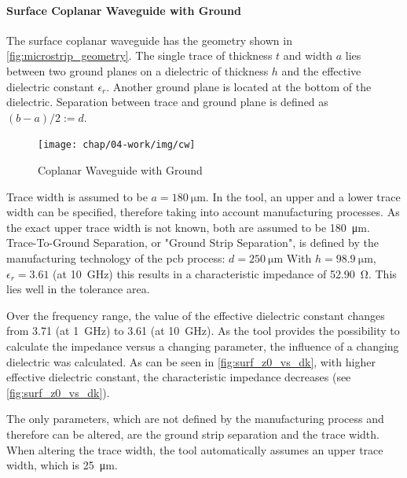 \paragraph{Surface Coplanar Waveguide with Ground}
The surface coplanar waveguide has the geometry shown in \autoref{fig:microstrip_geometry}.
The single trace of thickness $t$ and width $a$ lies between two ground planes on a dielectric of thickness $h$ and the effective dielectric constant $\epsilon_r$.
Another ground plane is located at the bottom of the dielectric.
Separation between trace and ground plane is defined as $(b-a)/2 := d$. 

\begin{figure}[!htbp]
	\centering
	\texttt{[image: chap/04-work/img/cw]}
	\caption{Coplanar Waveguide with Ground}
	\label{fig:microstrip_geometry}
\end{figure}

Trace width is assumed to be $a = \SI{180}{\micro\meter}$.
In the tool, an upper and a lower trace width can be specified, therefore taking into account manufacturing processes. %
As the exact upper trace width is not known, both are assumed to be \SI{180}{\micro\meter}.
Trace-To-Ground Separation, or "Ground Strip Separation", is defined by the manufacturing technology of the \gls{pcb} process: $d = \SI{250}{\micro\meter}$
With $h = \SI{98.9}{\micro \meter}$, $\epsilon_r = 3.61$ (at \SI{10}{\GHz}) this results in a characteristic impedance of \SI{52.90}{\ohm}. This lies well in the tolerance area. %

Over the frequency range, the value of the effective dielectric constant changes from 3.71 (at \SI{1}{\GHz}) to 3.61 (at \SI{10}{\GHz}).
As the tool provides the possibility to calculate the impedance versus a changing parameter, the influence of a changing dielectric was calculated. %
As can be seen in \autoref{fig:surf_z0_vs_dk}, with higher effective dielectric constant, the characteristic impedance decreases (see \autoref{fig:surf_z0_vs_dk}).

The only parameters, which are not defined by the manufacturing process and therefore can be altered, are the ground strip separation and the trace width. %
When altering the trace width, the tool automatically assumes an upper trace width, which is \SI{25}{\micro \meter}.


